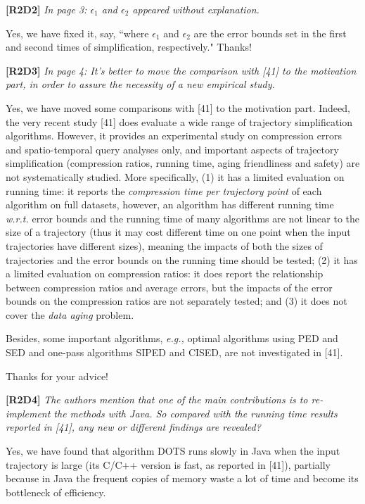 \documentclass{letter}
\newcommand{\eg}{\emph{e.g.,}\xspace}
\newcommand{\wrt}{\emph{w.r.t.}\xspace}
\begin{document}
{\textbf{[R2D2]} \emph{In page 3: $\epsilon_1$ and $\epsilon_2$ appeared without explanation.}

Yes, we have fixed it, say, ``{where $\epsilon_1$ and $\epsilon_2$ are the error bounds set in the first and second times of simplification, respectively.}" 
Thanks!

\textbf{[R2D3]} \emph{ In page 4: It’s better to move the comparison with [41] to the motivation part, in order to assure the necessity of a new empirical study.}

Yes, we have moved some comparisons with [41] to the motivation part. Indeed, the very recent study [41] does evaluate a wide range of trajectory simplification algorithms.
However, it provides {an experimental study} on compression errors and spatio-temporal query analyses only, and important aspects of trajectory simplification (compression ratios, running time, aging friendliness and safety) are not systematically studied. 
{More specifically,}
{(1) it has a limited evaluation on running time: it reports the \emph{compression time per trajectory point} of each algorithm on full datasets, however, an algorithm has different running time \wrt error bounds and the running time of many algorithms are not linear to the size of a trajectory (thus it may cost different time on one point when the input trajectories have different sizes), meaning the impacts of both the sizes of trajectories and the error bounds on the running time should be tested;}
%
{(2) it has a limited evaluation on compression ratios: it does report the relationship between compression ratios and average errors, but the impacts of the error bounds on the compression ratios are not separately tested; and }
%
(3) it does not cover the \emph{data aging} problem.
%
{Besides, some important algorithms, \eg optimal algorithms using PED and SED and one-pass algorithms SIPED and CISED, are not investigated in [41]. 
%


Thanks for your advice!

\textbf{[R2D4]} \emph{The authors mention that one of the main contributions is to re-implement the methods with Java. So compared with the running time results reported in [41], any new or different findings are revealed?}

Yes, we have found that algorithm DOTS runs slowly in Java when the input trajectory is large (its C/C++ version is fast, as reported in [41]), partially because in Java the frequent copies of memory waste a lot of time and become its bottleneck of efficiency.




}}
\end{document}
